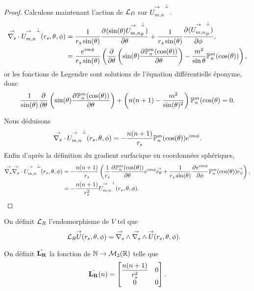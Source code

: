 \begin{proof}
      Calculons maintenant l'action de \({\mathcal{L}_D}\) sur \({\overset{\rightarrow}{U_{m,n}^{{}}}}^\perp\).
      \begin{align*}
        {\overset{\rightarrow}{\nabla_s}} \cdot{}{\overset{\rightarrow}{U_{m,n}^{{}}}}^\perp(r_s,\theta,\phi) &= \dfrac{1}{r_s\sin(\theta)} \dfrac{\partial^{{}} (\sin(\theta){\overset{\rightarrow}{U_{m,n}^{{}}}}^\perp_\theta)}{{\partial \theta}^{{}}} + \dfrac{1}{r_s\sin(\theta)}\dfrac{\partial^{{}} ({\overset{\rightarrow}{U_{m,n}^{{}}}}^\perp_\phi)}{{\partial \phi}^{{}}},
        \\
        &= \dfrac{e^{im\phi}}{r_s\sin(\theta)}
        \left(
          \dfrac{\partial^{{}} }{{\partial \theta}^{{}}}\left(\sin(\theta)\dfrac{\partial^{{}} \mathbb{P}^m_n(\cos(\theta))}{{\partial \theta}^{{}}}\right) - \dfrac{m^2}{\sin\theta}\mathbb{P}^m_n(\cos(\theta))
        \right),
      \end{align*}
      or les fonctions de Legendre sont solutions de l'équation différentielle éponyme, donc
      \begin{align*}
        \dfrac{1}{\sin(\theta)}\dfrac{\partial^{{}} }{{\partial \theta}^{{}}}\left(\sin(\theta)\dfrac{\partial^{{}} \mathbb{P}^m_n(\cos(\theta))}{{\partial \theta}^{{}}}\right) + \left(n(n+1)-\dfrac{m^2}{\sin(\theta)^2}\right)\mathbb{P}^m_n(\cos(\theta) = 0.
      \end{align*}

      Nous déduisons 
      \begin{align*}
         {\overset{\rightarrow}{\nabla_s}} \cdot{}{\overset{\rightarrow}{U_{m,n}^{{}}}}^\perp(r_s,\theta,\phi) = -\dfrac{n(n+1)}{r_s}\mathbb{P}^m_n(\cos(\theta))e^{im\phi}.
      \end{align*}
      Enfin d’après la définition du gradient surfacique en coordonnées sphériques,
      \begin{align*}
         {\overset{\rightarrow}{\nabla_s}}{}{\overset{\rightarrow}{\nabla_s}} \cdot{}{\overset{\rightarrow}{U_{m,n}^{{}}}}^\perp(r_s,\theta,\phi) &= -\dfrac{n(n+1)}{r_s}\left(\dfrac{1}{r_s}\dfrac{\partial^{{}} \mathbb{P}^m_n(\cos(\theta))}{{\partial \theta}^{{}}}e^{im\phi}{\overset{\rightarrow}{e_\theta}}+\dfrac{1}{r_s\sin(\theta)}\dfrac{\partial^{{}} e^{im\phi}}{{\partial \phi}^{{}}}\mathbb{P}^m_n(\cos(\theta)){\overset{\rightarrow}{e_\phi}}\right),
         \\
         &=-\dfrac{n(n+1)}{r_s^2}{\overset{\rightarrow}{U_{m,n}^{{}}}}^\perp(r_s,\theta,\phi).
      \end{align*}
    \end{proof}


    \begin{defn}
      \label{eq:sphere:fourier:LR}
      On définit \({\mathcal{L}_R}\) l'endomorphisme de \(V\) tel que
      \begin{align*}
        {\mathcal{L}_R} {\overset{\rightarrow}{U}}(r_s,\theta,\phi) & = {\overset{\rightarrow}{\nabla_s}} \wedge{} {\overset{\rightarrow}{\nabla_s}} \wedge{} {\overset{\rightarrow}{U}}(r_s,\theta,\phi).
      \end{align*}

      On définit \(\hat{\mathbf{L_R}}\) la fonction de \(\mathbb N \rightarrow \mathcal{M}_2(\mathbb R)\) telle que
      \begin{equation*}
        \hat{\mathbf{L_R}}(n) =
        \begin{bmatrix}
          \dfrac{n(n+1)}{r_s^2} & 0
          \\
          0 & 0
        \end{bmatrix}.
      \end{equation*}
    \end{defn}

